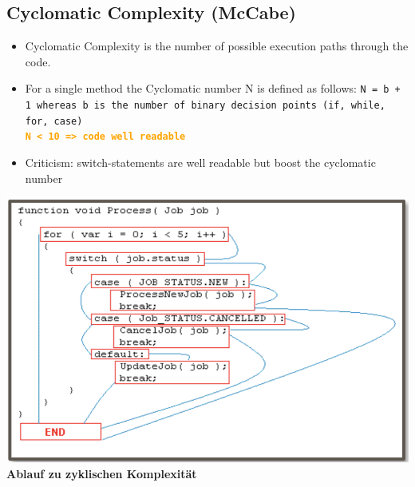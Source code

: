 \documentclass[10pt]{article}
\begin{document}
	\subsection{Cyclomatic Complexity (McCabe)}
	\begin{itemize}
		\item Cyclomatic Complexity is the number of possible execution paths through the code.
		\item For a single method the Cyclomatic number N is defined as follows:
			\subitem \texttt{N = b + 1 whereas b is the number of binary decision points (if, while, for, case) 
			\\
			\textcolor{orange}{\textbf{N < 10 => code well readable}}}
								
		\item Criticism: switch-statements are well readable but boost the cyclomatic number
	\end{itemize}
	\begin{center}
		\includegraphics[scale=0.5]{assets/caclomatic_complexity.png} \\
		\textbf{Ablauf zu zyklischen Komplexität}
	\end{center}
	
	
\end{document}
